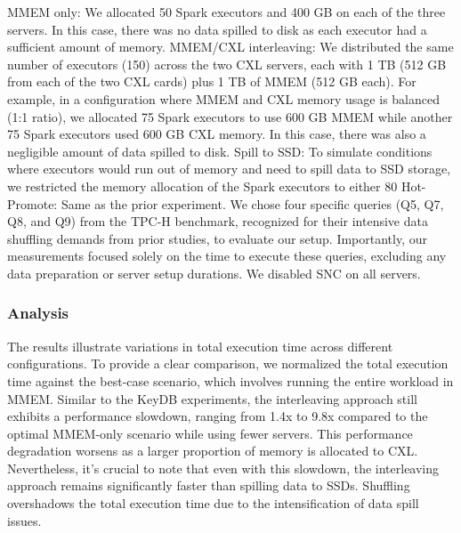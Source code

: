 MMEM only: We allocated 50 Spark executors and 400 GB on each of the three servers. In this case, there was no data spilled to disk as each executor had a sufficient amount of memory.
MMEM/CXL interleaving: We distributed the same number of executors (150) across the two CXL servers, each with 1 TB (512 GB from each of the two CXL cards) plus 1 TB of MMEM (512 GB each). For example, in a configuration where MMEM and CXL memory usage is balanced (1:1 ratio), we allocated 75 Spark executors to use 600 GB MMEM while another 75 Spark executors used 600 GB CXL memory. In this case, there was also a negligible amount of data spilled to disk.
Spill to SSD: To simulate conditions where executors would run out of memory and need to spill data to SSD storage, we restricted the memory allocation of the Spark executors to either 80%
Hot-Promote: Same as the prior experiment.
We chose four specific queries (Q5, Q7, Q8, and Q9) from the TPC-H benchmark, recognized for their intensive data shuffling demands from prior studies, to evaluate our setup. Importantly, our measurements focused solely on the time to execute these queries, excluding any data preparation or server setup durations. We disabled SNC on all servers.

\subsubsection{Analysis}

The results illustrate variations in total execution time across different configurations. To provide a clear comparison, we normalized the total execution time against the best-case scenario, which involves running the entire workload in MMEM. Similar to the KeyDB experiments, the interleaving approach still exhibits a performance slowdown, ranging from 1.4x to 9.8x compared to the optimal MMEM-only scenario while using fewer servers. This performance degradation worsens as a larger proportion of memory is allocated to CXL. Nevertheless, it's crucial to note that even with this slowdown, the interleaving approach remains significantly faster than spilling data to SSDs. Shuffling overshadows the total execution time due to the intensification of data spill issues.

